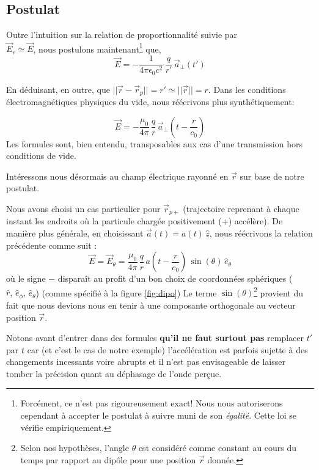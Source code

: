 \subsection{Postulat}
Outre l'intuition sur la relation de proportionnalité suivie par\\ $\vec{E}_{r} \simeq \vec{E}$, nous postulons maintenant\footnote{Forcément, ce n'est pas rigoureusement exact! Nous nous autoriserons cependant à accepter le postulat à suivre muni de son \textit{égalité}. Cette loi se vérifie empiriquement.} que,
$$ \vec{E} = -\frac{1}{4\pi\epsilon_{0}c^2} \,\frac{q}{r'}\,\vec{a}_{\perp}(t')$$

En déduisant, en outre, que $||\vec{r} - \vec{r}_p|| = r' \simeq ||\vec{r}|| = r$. Dans les conditions électromagnétiques physiques du vide, nous réécrivons plus synthétiquement: 

$$ \vec{E} = -\frac{\mu_0}{4\pi} \,\frac{q}{r}\,\vec{a}_{\perp}(t-\frac{r}{c_0})$$
Les formules sont, bien entendu, transposables aux cas d'une transmission hors conditions de vide.

Intéressons nous désormais au champ électrique rayonné en $\vec{r}$ sur base de notre postulat.

Nous avons choisi un cas particulier pour $\vec{r}_{p+}$ (trajectoire reprenant à chaque instant les endroits où la particule chargée positivement (+) accélère). De manière plus générale, en choisissant $\vec{a}(t) = a(t)\,\hat{z}$, nous réécrivons la relation précédente comme suit : 
$$ \vec{E} = \vec{E}_{\theta} = \frac{\mu_0}{4\pi} \,\frac{q}{r}\,a(t-\frac{r}{c_0}) \, \sin(\theta)\,\hat{e}_{\theta}$$ où le signe $-$ disparaît au profit d'un bon choix de coordonnées sphériques ($\hat{r},\,\hat{e}_{\phi},\,\hat{e}_{\theta}$) (comme spécifié à la figure \ref{fig:dipo}) Le terme $\sin(\theta)$\footnote{Selon nos hypothèses, l'angle $\theta$ est considéré comme constant au cours du temps par rapport au dipôle pour une position $\vec{r}$ donnée.} provient du fait que nous devions nous en tenir à une composante orthogonale au vecteur position $\vec{r}$.

Notons avant d'entrer dans des formules \textbf{qu'il ne faut surtout pas} remplacer $t'$ par $t$ car (et c'est le cas de notre exemple) l'accélération est parfois sujette à des changements incessants voire abrupts et il n'est pas envisageable de laisser tomber la précision quant au déphasage de l'onde perçue.

